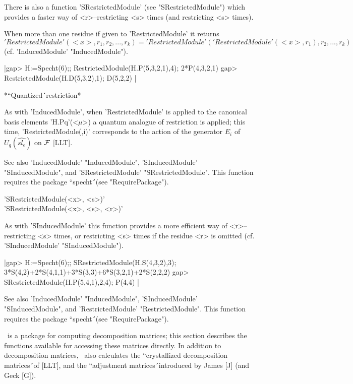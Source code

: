 There is also a function 'SRestrictedModule' (see "SRestrictedModule") 
which provides a faster way of <r>--restricting <s> times (and restricting
<s> times).

When more than one residue if given to 'RestrictedModule' it returns
$$'RestrictedModule'(<x>,r_1,r_2,...,r_k)=
     'RestrictedModule'('RestrictedModule'(<x>,r_1),r_2,...,r_k) $$
(cf. 'InducedModule' "InducedModule"). 

|gap> H:=Specht(6);; RestrictedModule(H.P(5,3,2,1),4);
2*P(4,3,2,1)
gap> RestrictedModule(H.D(5,3,2),1); 
D(5,2,2) |

*``Quantized\'\'\ restriction*

As with 'InducedModule', when 'RestrictedModule' is applied to the 
canonical basis elements 'H.Pq'(<$\mu$>) a quantum analogue of restriction
is applied; this time, 'RestrictedModule(\*,i)' corresponds to the action 
of the generator $E_i$ of $U_q(\widehat{sl_e})$ on ${\cal F}$ [LLT].

See also 'InducedModule' "InducedModule", 'SInducedModule' 
"SInducedModule", and 'SRestrictedModule' "SRestrictedModule". This 
function requires the package ``specht\'\'\ 
(see "RequirePackage").




'SRestrictedModule(<x>, <s>)'\\
'SRestrictedModule(<x>, <s>, <r>)'

As with 'SInducedModule' this function provides a more efficient way of
<r>--restricting <s> times, or restricting <s> times if the residue <r>
is omitted (cf. 'SInducedModule' "SInducedModule").


|gap> H:=Specht(6);; SRestrictedModule(H.S(4,3,2),3);
3*S(4,2)+2*S(4,1,1)+3*S(3,3)+6*S(3,2,1)+2*S(2,2,2)
gap> SRestrictedModule(H.P(5,4,1),2,4);
P(4,4) |

See also 'InducedModule' "InducedModule", 'SInducedModule' 
"SInducedModule", and 'RestrictedModule' "RestrictedModule". This function 
requires the package ``specht\'\'\ (see "RequirePackage").



\Specht\ is a package for computing decomposition matrices; this section
describes the functions available for accessing these matrices directly.
In addition to decomposition matrices, \Specht\ also calculates the
``crystallized decomposition matrices\'\'\ of [LLT], and the ``adjustment
matrices\'\'\ introduced by James [J] (and Geck [G]).

